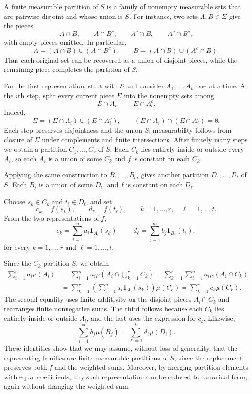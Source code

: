 \documentclass[11pt,a4paper]{article}
\newcommand{\studyheading}[1]{{\color{StudyBlue}\normalfont\bfseries\boldmath #1}}
\begin{document}
\par\noindent\studyheading{Proof.}\par\nobreak

\par\noindent\studyheading{Reduction to disjoint partitions.}\par\nobreak

A finite measurable partition of $S$ is a family of nonempty measurable sets that are pairwise disjoint and whose union is $S$. For instance, two sets $A,B\in\Sigma$ give the pieces
\[
A\cap B,\qquad A\cap B^c,\qquad A^c\cap B,\qquad A^c\cap B^c,
\]
with empty pieces omitted. In particular,
\[
A=(A\cap B)\cup(A\cap B^c),\qquad
B=(A\cap B)\cup(A^c\cap B).
\]
Thus each original set can be recovered as a union of disjoint pieces, while the remaining piece completes the partition of $S$.

For the first representation, start with $S$ and consider $A_1,\ldots,A_n$ one at a time. At the $i$th step, split every current piece $E$ into the nonempty sets among
\[
E\cap A_i,\qquad E\cap A_i^c.
\]
Indeed,
\[
E=(E\cap A_i)\cup(E\cap A_i^c),\qquad
(E\cap A_i)\cap(E\cap A_i^c)=\emptyset.
\]
Each step preserves disjointness and the union $S$; measurability follows from closure of $\Sigma$ under complements and finite intersections. After finitely many steps we obtain a partition $C_1,\ldots,C_r$ of $S$. Each $C_k$ lies entirely inside or outside every $A_i$, so each $A_i$ is a union of some $C_k$ and $f$ is constant on each $C_k$.

Applying the same construction to $B_1,\ldots,B_m$ gives another partition $D_1,\ldots,D_t$ of $S$. Each $B_j$ is a union of some $D_\ell$, and $f$ is constant on each $D_\ell$.

Choose $s_k\in C_k$ and $t_\ell\in D_\ell$, and set
\[
c_k=f(s_k),\qquad d_\ell=f(t_\ell),
\qquad k=1,\ldots,r,\quad \ell=1,\ldots,t.
\]
From the two representations of $f$,
\[
c_k=\sum_{i=1}^{n}a_i\mathbf1_{A_i}(s_k),\qquad
d_\ell=\sum_{j=1}^{m}b_j\mathbf1_{B_j}(t_\ell),
\]
for every $k=1,\ldots,r$ and $\ell=1,\ldots,t$.

Since the $C_k$ partition $S$, we obtain
\[
\begin{aligned}
\sum_{i=1}^{n}a_i\mu(A_i)&=\sum_{i=1}^{n}a_i\mu\left(A_i\cap\bigcup_{k=1}^{r}C_k\right) =\sum_{k=1}^{r}\sum_{i=1}^{n}a_i\mu(A_i\cap C_k)\\
&=\sum_{k=1}^{r}\left(\sum_{i=1}^{n}a_i\mathbf1_{A_i}(s_k)\right)\mu(C_k) =\sum_{k=1}^{r}c_k\mu(C_k).
\end{aligned}
\]
The second equality uses finite additivity on the disjoint pieces $A_i\cap C_k$ and rearranges finite nonnegative sums. The third follows because each $C_k$ lies entirely inside or outside $A_i$, and the last uses the expression for $c_k$. Likewise,
\[
\sum_{j=1}^{m}b_j\mu(B_j)=\sum_{\ell=1}^{t}d_\ell\mu(D_\ell).
\]
These identities show that we may assume, without loss of generality, that the representing families are finite measurable partitions of $S$, since the replacement preserves both $f$ and the weighted sums. Moreover, by merging partition elements with equal coefficients, any such representation can be reduced to canonical form, again without changing the weighted sum.
\end{document}
